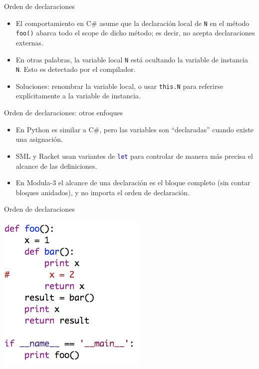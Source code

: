 \documentclass{beamer} %
\newcommand{\blue}[1]{\textcolor{blue}{#1}}
\begin{document}
\begin{frame}{Orden de declaraciones}
    \begin{itemize}
        \item El comportamiento en C\# asume que la declaración local de \texttt{N} en el método \texttt{foo()} abarca todo el scope de dicho método; es decir, no acepta declaraciones externas.
        \item En otras palabras, la variable local \texttt{N} está ocultando la variable de instancia \texttt{N}. Esto es detectado por el compilador.
        \item Soluciones: renombrar la variable local, o usar \texttt{this.N} para referirse explícitamente a la variable de instancia.
    \end{itemize}
\end{frame}

\begin{frame}{Orden de declaraciones: otros enfoques}
    \begin{itemize}
        \item En Python es similar a C\#, pero las variables son ``declaradas'' cuando existe una asignación.
        \item SML y Racket usan variantes de \blue{\texttt{let}} para controlar de manera más precisa el alcance de las definiciones.
        \item En Modula-3 el alcance de una declaración es el bloque completo (sin contar bloques anidados), y no importa el orden de declaración.
    \end{itemize}
\end{frame}

\begin{frame}{Orden de declaraciones}
    \begin{center}
        \includegraphics[width=.5\textwidth]{./image/cap5/scope-modula3}
    \end{center}
\end{frame}
\end{document}
